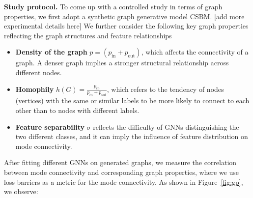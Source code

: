 \noindent\textbf{Study protocol.} To come up with a controlled study in terms of graph properties, we first adopt a synthetic graph generative model CSBM. [add more experimental details here] We further consider the following key graph properties reflecting the graph structures and feature relationships 
\begin{itemize}[leftmargin=0pt, nosep]
    \item \textbf{Density of the graph} \textbf{{\(p = (p_{\mathrm{in}} + p_{\mathrm{out}})\)}},  which affects the connectivity of a graph. A denser graph implies a stronger structural relationship across different nodes. 
    \item \textbf{Homophily} \textbf{$h(G)= \frac{p_{in}}{p_{in} + p_{out}} $}, which
    refers to the tendency of nodes (vertices) with the same or similar labels to be more likely to connect to each other than to nodes with different labels.
    \item \textbf{Feature separability} \textbf{{\(\sigma\)}} reflects the difficulty of GNNs distinguishing the two different classes, and it can imply the influence of feature distribution on mode connectivity.
\end{itemize}

After fitting different GNNs on generated graphs, we measure the correlation between mode connectivity and corresponding graph properties, where we use loss barriers as a metric for the mode connectivity. As shown in Figure~\ref{fig:gp}, we observe:

